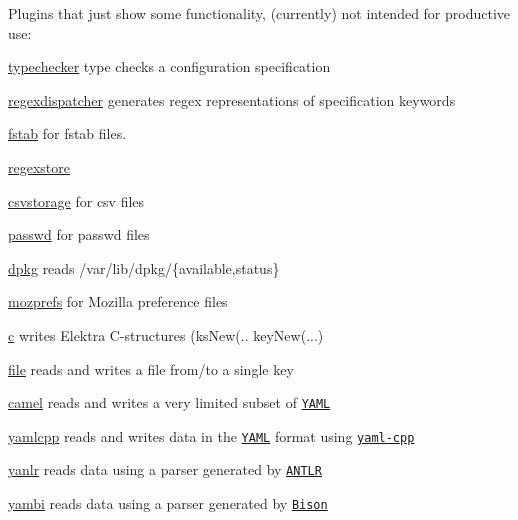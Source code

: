 Plugins that just show some functionality, (currently) not intended for productive use\+:


\begin{DoxyItemize}
\item \hyperlink{md_src_plugins_typechecker_README_src_plugins_typechecker_README_md}{typechecker} type checks a configuration specification
\item \hyperlink{md_src_plugins_regexdispatcher_README_src_plugins_regexdispatcher_README_md}{regexdispatcher} generates regex representations of specification keywords
\item \hyperlink{md_src_plugins_fstab_README_src_plugins_fstab_README_md}{fstab} for fstab files.
\item \hyperlink{md_src_plugins_regexstore_README_src_plugins_regexstore_README_md}{regexstore}
\item \hyperlink{md_src_plugins_csvstorage_README_src_plugins_csvstorage_README_md}{csvstorage} for csv files
\item \hyperlink{md_src_plugins_passwd_README_src_plugins_passwd_README_md}{passwd} for passwd files
\item \hyperlink{md_src_plugins_dpkg_README_src_plugins_dpkg_README_md}{dpkg} reads /var/lib/dpkg/\{available,status\}
\item \hyperlink{md_src_plugins_mozprefs_README_src_plugins_mozprefs_README_md}{mozprefs} for Mozilla preference files
\item \hyperlink{md_src_plugins_c_README_src_plugins_c_README_md}{c} writes Elektra C-\/structures ({\ttfamily ks\+New(.. key\+New(...})
\item \hyperlink{md_src_plugins_file_README_src_plugins_file_README_md}{file} reads and writes a file from/to a single key
\item \hyperlink{md_src_plugins_camel_README_src_plugins_camel_README_md}{camel} reads and writes a very limited subset of \href{http://www.yaml.org}{\tt Y\+A\+ML}
\item \hyperlink{md_src_plugins_yamlcpp_README_src_plugins_yamlcpp_README_md}{yamlcpp} reads and writes data in the \href{http://www.yaml.org}{\tt Y\+A\+ML} format using \href{https://github.com/jbeder/yaml-cpp}{\tt yaml-\/cpp}
\item \hyperlink{md_src_plugins_yanlr_README_src_plugins_yanlr_README_md}{yanlr} reads data using a parser generated by \href{http://www.antlr.org}{\tt A\+N\+T\+LR}
\item \hyperlink{md_src_plugins_yambi_README_src_plugins_yambi_README_md}{yambi} reads data using a parser generated by \href{https://www.gnu.org/software/bison}{\tt Bison}

\end{DoxyItemize}
